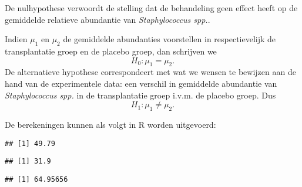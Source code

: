 \documentclass[12pt,dutch,coursenotes]{book}
\newenvironment{Shaded}{\begin{snugshade}}{\end{snugshade}}
\newcommand{\KeywordTok}[1]{\textcolor[rgb]{0.13,0.29,0.53}{\textbf{#1}}}
\newcommand{\StringTok}[1]{\textcolor[rgb]{0.31,0.60,0.02}{#1}}
\newcommand{\OperatorTok}[1]{\textcolor[rgb]{0.81,0.36,0.00}{\textbf{#1}}}
\newcommand{\NormalTok}[1]{#1}
\theoremstyle{definition}
\theoremstyle{definition}
\theoremstyle{definition}
\theoremstyle{remark}
\begin{document}
De nulhypothese verwoordt de stelling dat de behandeling geen effect
heeft op de gemiddelde relatieve abundantie van \emph{Staphylococcus
spp.}.

Indien \(\mu_1\) en \(\mu_2\) de gemiddelde abundanties voorstellen in
respectievelijk de transplantatie groep en de placebo groep, dan
schrijven we \[   H_0: \mu_1=\mu_2.\] De alternatieve hypothese
correspondeert met wat we wensen te bewijzen aan de hand van de
experimentele data: een verschil in gemiddelde abundantie van
\emph{Staphylococcus spp.} in de transplantatie groep i.v.m. de placebo
groep. Dus \[H_1: \mu_1\neq \mu_2.\]

De berekeningen kunnen als volgt in R worden uitgevoerd:

\begin{Shaded}
\end{Shaded}

\begin{verbatim}
## [1] 49.79
\end{verbatim}

\begin{Shaded}
\end{Shaded}

\begin{verbatim}
## [1] 31.9
\end{verbatim}

\begin{Shaded}
\end{Shaded}

\begin{verbatim}
## [1] 64.95656
\end{verbatim}
\end{document}

